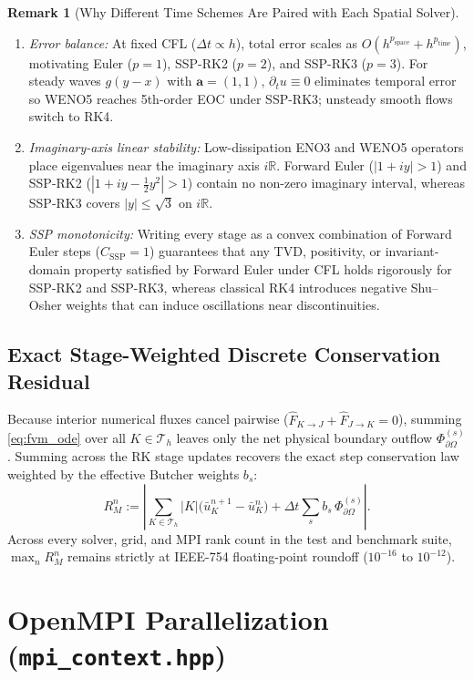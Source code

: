 \documentclass[11pt,a4paper]{article}
\theoremstyle{definition}
\newtheorem{remark}{Remark}[section]
\newcommand{\R}{\mathbb{R}}
\newcommand{\abs}[1]{\left\lvert #1 \right\rvert}
\newcommand{\code}[1]{\texttt{#1}}
\begin{document}
\begin{remark}[Why Different Time Schemes Are Paired with Each Spatial Solver]
\leavevmode
\begin{enumerate}
\item \emph{Error balance:} At fixed CFL ($\Delta t \propto h$), total error scales as $O(h^{p_{\text{space}}} + h^{p_{\text{time}}})$, motivating Euler ($p=1$), SSP-RK2 ($p=2$), and SSP-RK3 ($p=3$). For steady waves $g(y-x)$ with $\mathbf{a}=(1,1)$, $\partial_t u \equiv 0$ eliminates temporal error so WENO5 reaches 5th-order EOC under SSP-RK3; unsteady smooth flows switch to RK4.
\item \emph{Imaginary-axis linear stability:} Low-dissipation ENO3 and WENO5 operators place eigenvalues near the imaginary axis $i\R$. Forward Euler ($|1+iy|>1$) and SSP-RK2 ($|1+iy-\frac{1}{2}y^2|>1$) contain no non-zero imaginary interval, whereas SSP-RK3 covers $|y| \le \sqrt{3}$ on $i\R$.
\item \emph{SSP monotonicity:} Writing every stage as a convex combination of Forward Euler steps ($C_{\mathrm{SSP}} = 1$) guarantees that any TVD, positivity, or invariant-domain property satisfied by Forward Euler under CFL holds rigorously for SSP-RK2 and SSP-RK3, whereas classical RK4 introduces negative Shu--Osher weights that can induce oscillations near discontinuities.
\end{enumerate}
\end{remark}

\subsection{Exact Stage-Weighted Discrete Conservation Residual}

Because interior numerical fluxes cancel pairwise ($\hat{F}_{K\to J} + \hat{F}_{J\to K} = 0$), summing \eqref{eq:fvm_ode} over all $K\in\mathcal{T}_h$ leaves only the net physical boundary outflow $\Phi_{\partial\Omega}^{(s)}$. Summing across the RK stage updates recovers the exact step conservation law weighted by the effective Butcher weights $b_s$:
\[
R_M^n := \abs{\sum_{K\in\mathcal{T}_h} |K|\bigl(\bar{u}_K^{n+1} - \bar{u}_K^n\bigr) + \Delta t \sum_s b_s\,\Phi_{\partial\Omega}^{(s)}}.
\]
Across every solver, grid, and MPI rank count in the test and benchmark suite, $\max_n R_M^n$ remains strictly at IEEE-754 floating-point roundoff ($10^{-16}$ to $10^{-12}$).

\section{OpenMPI Parallelization (\code{mpi\_context.hpp})}
\end{document}
